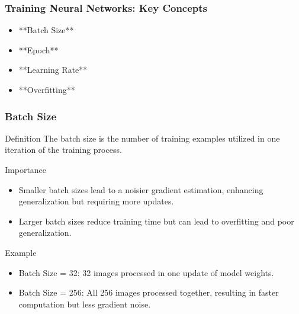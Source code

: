 \documentclass[aspectratio=169]{beamer}
\begin{document}
\begin{frame}[fragile]
    \frametitle{Training Neural Networks: Key Concepts}

    \begin{itemize}
        \item **Batch Size** 
        \item **Epoch** 
        \item **Learning Rate**
        \item **Overfitting**
    \end{itemize}
\end{frame}

\begin{frame}[fragile]
    \frametitle{Batch Size}

    \begin{block}{Definition}
        The batch size is the number of training examples utilized in one iteration of the training process.
    \end{block}

    \begin{block}{Importance}
        \begin{itemize}
            \item Smaller batch sizes lead to a noisier gradient estimation, enhancing generalization but requiring more updates.
            \item Larger batch sizes reduce training time but can lead to overfitting and poor generalization.
        \end{itemize}
    \end{block}

    \begin{block}{Example}
        \begin{itemize}
            \item Batch Size = 32: 32 images processed in one update of model weights.
            \item Batch Size = 256: All 256 images processed together, resulting in faster computation but less gradient noise.
        \end{itemize}
    \end{block}
\end{frame}
\end{document}
